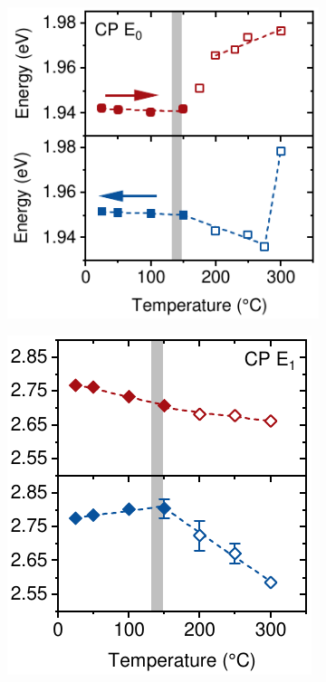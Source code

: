 \begin{figure}[htbp]
    \centering
    \begin{subfigure}{0.34\textwidth}
        \includegraphics[width=\textwidth]{chapters/ellipsometry/image/CP0.pdf}
        \caption{}
        \label{fig:ellipsometry:CP0}
    \end{subfigure}
    \hfill
    \begin{subfigure}{0.31\textwidth}
        \includegraphics[width=\textwidth]{chapters/ellipsometry/image/CP1.pdf}

\end{subfigure}
\end{figure}
